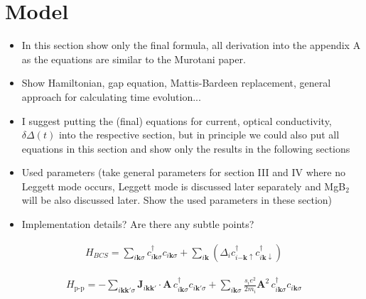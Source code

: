 \documentclass[aps,prb,reprint,noeprint,superscriptaddress]{revtex4-2}
\begin{document}
\section{Model}
\label{sec:model}

\begin{itemize}
	\item In this section show only the final formula, all derivation into the appendix A as the equations are similar to the Murotani paper.
	\item Show Hamiltonian, gap equation, Mattis-Bardeen replacement, general approach for calculating time evolution...
	\item I suggest putting the (final) equations for current, optical conductivity, $\delta\Delta(t)$ into the respective section, but in principle we could also put all equations in this section and show only the results in the following sections

	\item Used parameters (take general parameters for section III and IV where no Leggett mode occurs, Leggett mode is discussed later separately and MgB$_2$ will be also discussed later. Show the used parameters in these section)
	\item Implementation details? Are there any subtle points?
\end{itemize}


\begin{eqnarray}
	H_{BCS} = \sum_{i\mathbf{k}\sigma} c_{i\mathbf{k}\sigma}^\dagger
	c_{i\mathbf{k}\sigma} + \sum_{i\mathbf{k}}^{}
	\left( \Delta_i c_{i\mathbf{-k}\uparrow }^\dagger
	c_{i\mathbf{k}\downarrow }^\dagger  \right)
\end{eqnarray}

\begin{eqnarray}
	H_{\text{p-p}} = -\sum_{i\mathbf{kk'}\sigma}^{}
	\mathbf{J}_{i\mathbf{kk'}} \cdot \mathbf{A} \,
	c_{i\mathbf{k}\sigma}^\dagger  c_{i\mathbf{k}'\sigma} +
	\sum_{i\mathbf{k}\sigma}^{} \frac{s_i e^2}{2m_i} \mathbf{A}^2 \,
	c_{i\mathbf{k}\sigma}^\dagger c_{i\mathbf{k}\sigma}
\end{eqnarray}
\end{document}
